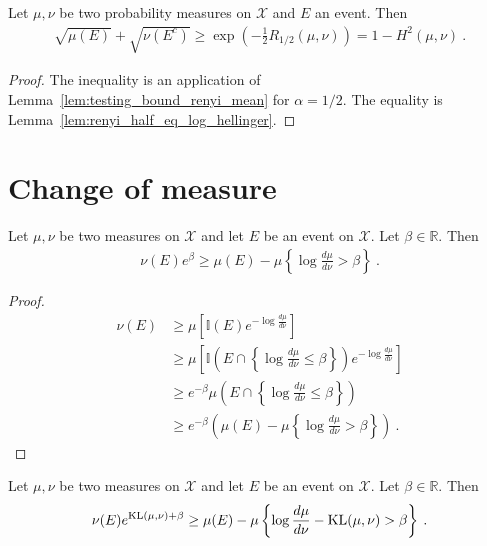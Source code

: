 \begin{corollary}
  \label{cor:testing_bound_hellinger}
  Let $\mu, \nu$ be two probability measures on $\mathcal X$ and $E$ an event. Then
  \begin{align*}
  \sqrt{\mu(E)} + \sqrt{\nu(E^c)}
  \ge \exp\left(-\frac{1}{2} R_{1/2}(\mu, \nu)\right)
  = 1 - H^2(\mu, \nu)
  \: .
  \end{align*}
\end{corollary}

\begin{proof}
The inequality is an application of Lemma~\ref{lem:testing_bound_renyi_mean} for $\alpha = 1/2$. The equality is Lemma~\ref{lem:renyi_half_eq_log_hellinger}.
\end{proof}

\section{Change of measure}

\begin{lemma}
  \label{lem:llr_change_measure}
  Let $\mu, \nu$ be two measures on $\mathcal X$ and let $E$ be an event on $\mathcal X$. Let $\beta \in \mathbb{R}$. Then
  \begin{align*}
  \nu(E) e^{\beta} \ge \mu(E) - \mu\left\{ \log\frac{d \mu}{d \nu} > \beta \right\} \: .
  \end{align*}
\end{lemma}

\begin{proof}
\begin{align*}
\nu(E)
&\ge \mu\left[\mathbb{I}(E) e^{- \log\frac{d \mu}{d \nu} }\right]
\\
&\ge \mu\left[\mathbb{I}\left(E \cap \left\{\log\frac{d \mu}{d \nu} \le \beta\right\}\right) e^{- \log\frac{d \mu}{d \nu} }\right]
\\
&\ge e^{- \beta}\mu\left(E \cap \left\{\log\frac{d \mu}{d \nu} \le \beta\right\}\right)
\\
&\ge e^{- \beta}\left( \mu(E) - \mu\left\{ \log\frac{d \mu}{d \nu} > \beta \right\} \right)
\: .
\end{align*}
\end{proof}

\begin{corollary}
  \label{cor:kl_change_measure}
  Let $\mu, \nu$ be two measures on $\mathcal X$ and let $E$ be an event on $\mathcal X$. Let $\beta \in \mathbb{R}$. Then
  \begin{align*}
  \nu(E) e^{\mathrm{KL}(\mu, \nu) + \beta} \ge \mu(E) - \mu\left\{ \log\frac{d \mu}{d \nu} - \mathrm{KL}(\mu, \nu) > \beta \right\} \: .
  \end{align*}
\end{corollary}

